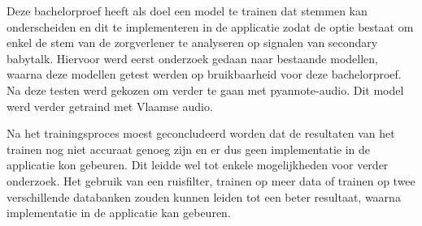 Deze bachelorproef heeft als doel een model te trainen dat stemmen kan onderscheiden en dit te implementeren in de applicatie zodat de optie bestaat om enkel de stem van de zorgverlener te analyseren op signalen van secondary babytalk. Hiervoor werd eerst onderzoek gedaan naar bestaande modellen, waarna deze modellen getest werden op bruikbaarheid voor deze bachelorproef. Na deze testen werd gekozen om verder te gaan met pyannote-audio. Dit model werd verder getraind met Vlaamse audio.

Na het trainingsproces moest geconcludeerd worden dat de resultaten van het trainen nog niet accuraat genoeg zijn en er dus geen implementatie in de applicatie kon gebeuren. Dit leidde wel tot enkele mogelijkheden voor verder onderzoek. Het gebruik van een ruisfilter, trainen op meer data of trainen op twee verschillende databanken zouden kunnen leiden tot een beter resultaat, waarna implementatie in de applicatie kan gebeuren.

